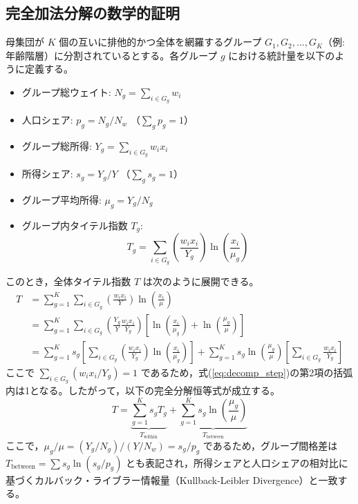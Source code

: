\documentclass[paper=a4,fontsize=10.5pt,line_length=42zw]{jlreq}
\begin{document}
\subsection{完全加法分解の数学的証明}
母集団が $K$ 個の互いに排他的かつ全体を網羅するグループ $G_1, G_2, \dots, G_K$（例: 年齢階層）に分割されているとする。各グループ $g$ における統計量を以下のように定義する。
\begin{itemize}
    \item グループ総ウェイト: $N_g = \sum_{i \in G_g} w_i$
    \item 人口シェア: $p_g = N_g / N_w$ （$\sum_g p_g = 1$）
    \item グループ総所得: $Y_g = \sum_{i \in G_g} w_i x_i$
    \item 所得シェア: $s_g = Y_g / Y$ （$\sum_g s_g = 1$）
    \item グループ平均所得: $\mu_g = Y_g / N_g$
    \item グループ内タイテル指数 $T_g$:
    \begin{equation}
        T_g = \sum_{i \in G_g} \left( \frac{w_i x_i}{Y_g} \right) \ln \left( \frac{x_i}{\mu_g} \right) \label{eq:theil_g}
    \end{equation}
\end{itemize}

このとき，全体タイテル指数 $T$ は次のように展開できる。
\begin{align}
    T &= \sum_{g=1}^K \sum_{i \in G_g} \left( \frac{w_i x_i}{Y} \right) \ln \left( \frac{x_i}{\mu} \right) \nonumber \\
      &= \sum_{g=1}^K \sum_{i \in G_g} \left( \frac{Y_g}{Y} \frac{w_i x_i}{Y_g} \right) \left[ \ln \left( \frac{x_i}{\mu_g} \right) + \ln \left( \frac{\mu_g}{\mu} \right) \right] \nonumber \\
      &= \sum_{g=1}^K s_g \left[ \sum_{i \in G_g} \left( \frac{w_i x_i}{Y_g} \right) \ln \left( \frac{x_i}{\mu_g} \right) \right] + \sum_{g=1}^K s_g \ln \left( \frac{\mu_g}{\mu} \right) \left[ \sum_{i \in G_g} \frac{w_i x_i}{Y_g} \right] \label{eq:decomp_step}
\end{align}
ここで $\sum_{i \in G_g} (w_i x_i / Y_g) = 1$ であるため，式(\ref{eq:decomp_step})の第2項の括弧内は1となる。したがって，以下の完全分解恒等式が成立する。
\begin{equation}
    T = \underbrace{\sum_{g=1}^K s_g T_g}_{T_{\text{within}}} + \underbrace{\sum_{g=1}^K s_g \ln \left( \frac{\mu_g}{\mu} \right)}_{T_{\text{between}}} \label{eq:additive_decomp}
\end{equation}
ここで，$\mu_g / \mu = (Y_g / N_g) / (Y / N_w) = s_g / p_g$ であるため，グループ間格差は $T_{\text{between}} = \sum s_g \ln(s_g / p_g)$ とも表記され，所得シェアと人口シェアの相対比に基づくカルバック・ライブラー情報量（Kullback-Leibler Divergence）と一致する。
\end{document}
